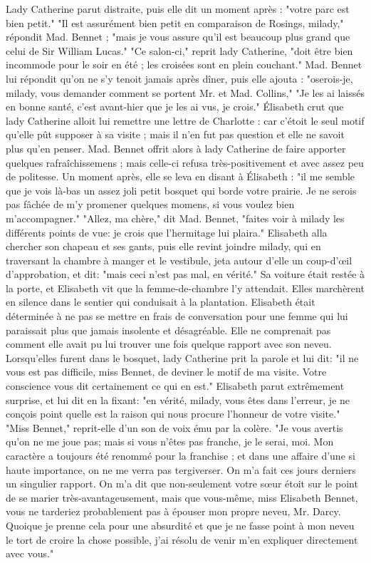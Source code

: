 Lady Catherine parut distraite, puis elle dit un moment après : "votre parc est bien petit."
"Il est assurément bien petit en comparaison de Rosings, milady," répondit Mad. Bennet ; "mais je vous assure qu’il est beaucoup plus grand que celui de Sir William Lucas."
"Ce salon-ci," reprit lady Catherine, "doit être bien incommode pour le soir en été ; les croisées sont en plein couchant."
Mad. Bennet lui répondit qu’on ne s’y tenoit jamais après dîner, puis elle ajouta : "oserois-je, milady, vous demander comment se portent Mr. et Mad. Collins,"
"Je les ai laissés en bonne santé, c’est avant-hier que je les ai vus, je crois."
Élisabeth crut que lady Catherine alloit lui remettre une lettre de Charlotte : car c’étoit le seul motif qu’elle pût supposer à sa visite ; mais il n’en fut pas question et elle ne savoit plus qu’en penser.
Mad. Bennet offrit alors à lady Catherine de faire apporter quelques rafraîchissemens ; mais celle-ci refusa très-positivement et avec assez peu de politesse. Un moment après, elle se leva en disant à Élisabeth : "il me semble que je vois là-bas un assez joli petit bosquet qui borde votre prairie. Je ne serois\setcounter{page}{252} pas fâchée de m'y promener quelques momens, si vous voulez bien m'accompagner."
"Allez, ma chère," dit Mad. Bennet, "faites voir à milady les différents points de vue: je crois que l'hermitage lui plaira."
Elisabeth alla chercher son chapeau et ses gants, puis elle revint joindre milady, qui en traversant la chambre à manger et le vestibule, jeta autour d'elle un coup-d'œil d'approbation, et dit: "mais ceci n'est pas mal, en vérité."
Sa voiture était restée à la porte, et Elisabeth vit que la femme-de-chambre l'y attendait. Elles marchèrent en silence dans le sentier qui conduisait à la plantation. Elisabeth était déterminée à ne pas se mettre en frais de conversation pour une femme qui lui paraissait plus que jamais insolente et désagréable. Elle ne comprenait pas comment elle avait pu lui trouver une fois quelque rapport avec son neveu.
Lorsqu'elles furent dans le bosquet, lady Catherine prit la parole et lui dit: "il ne vous est pas difficile, miss Bennet, de deviner le motif de ma visite. Votre conscience vous dit certainement ce qui en est."
Elisabeth parut extrêmement surprise, et lui dit en la fixant: "en vérité, milady, vous\setcounter{page}{253} êtes dans l'erreur, je ne conçois point quelle est la raison qui nous procure l'honneur de votre visite."
"Miss Bennet," reprit-elle d'un son de voix ému par la colère. "Je vous avertis qu'on ne me joue pas; mais si vous n'êtes pas franche, je le serai, moi. Mon caractère a toujours été renommé pour la franchise ; et dans une affaire d'une si haute importance, on ne me verra pas tergiverser. On m'a fait ces jours derniers un singulier rapport. On m'a dit que non-seulement votre sœur étoit sur le point de se marier très-avantageusement, mais que vous-même, miss Elisabeth Bennet, vous ne tarderiez probablement pas à épouser mon propre neveu, Mr. Darcy. Quoique je prenne cela pour une absurdité et que je ne fasse point à mon neveu le tort de croire la chose possible, j'ai résolu de venir m'en expliquer directement avec vous."
